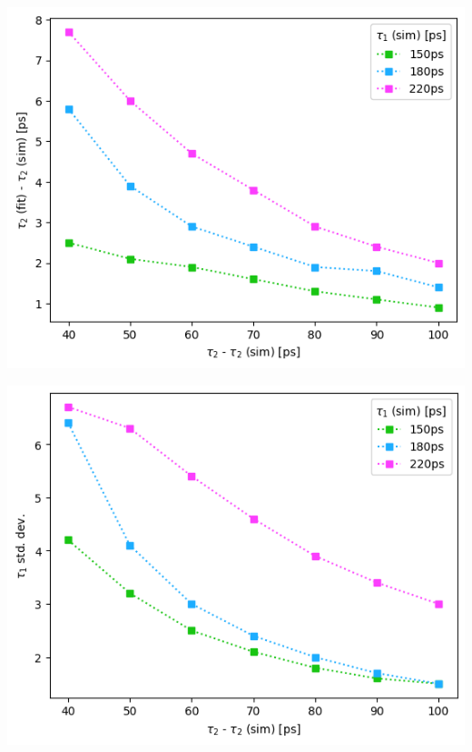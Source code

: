 \begin{minipage}{.5\linewidth}
    \centering
    \includegraphics[width=\linewidth]{Batch 3/regular IRF/t2-diff 5050.png}
    \label{fig:comp-t2-5050}
\end{minipage}
\begin{minipage}{.5\linewidth}
    \centering
    \includegraphics[width=\linewidth]{Batch 3/regular IRF/t2-err 5050.png}
    \label{fig:comp-t2err-5050}
\end{minipage}
